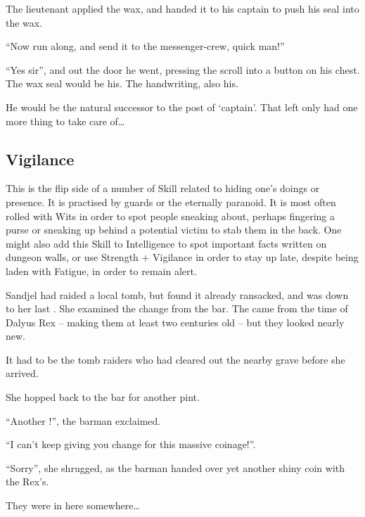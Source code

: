 \begin{multicols}{2}
\begin{exampletext}
  The lieutenant applied the wax, and handed it to his captain to push his seal into the wax.

  ``Now run along, and send it to the messenger-crew, quick man!''

  ``Yes sir'', and out the door he went, pressing the scroll into a button on his chest.
  The wax seal would be his.
  The handwriting, also his.

  He would be the natural successor to the post of `captain'.
  That left only had one more thing to take care of\ldots
  
\end{exampletext}

\subsection{Vigilance}

This is the flip side of a number of Skill related to hiding one's doings or presence.
It is practised by guards or the eternally paranoid.
It is most often rolled with Wits in order to spot people sneaking about, perhaps fingering a purse or sneaking up behind a potential victim to stab them in the back.
One might also add this Skill to Intelligence to spot important facts written on dungeon walls, or use Strength + Vigilance in order to stay up late, despite being laden with Fatigue, in order to remain alert.

\ifodd\value{r4}
\begin{exampletext}
  Sandjel had raided a local tomb, but found it already ransacked, and was down to her last .
  She examined the change from the bar.
  The  came from the time of Dalyus Rex -- making them at least two centuries old -- but they looked nearly new.

  It had to be the tomb raiders who had cleared out the nearby grave before she arrived.

  She hopped back to the bar for another pint.

  ``Another !'',
  the barman exclaimed.

  ``I can't keep giving you change for this massive coinage!''.

  ``Sorry'',
  she shrugged, as the barman handed over yet another shiny coin with the Rex's.

  They were in here somewhere\ldots

\end{exampletext}


\end{multicols}
